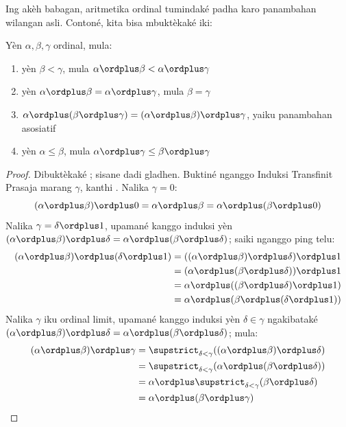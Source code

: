\documentclass[../../../include/open-logic-section]{subfiles}
\begin{document}
Ing akèh babagan, aritmetika ordinal tumindaké padha karo
panambahan wilangan asli. Contoné, kita bisa mbuktèkaké iki:

\begin{lem}
Yèn $\alpha, \beta, \gamma$ ordinal, mula:
\begin{enumerate}
	\item{} yèn $\beta < \gamma$, mula $\alpha
	\ordplus  \beta < \alpha \ordplus  \gamma$
	\item{} yèn $\alpha \ordplus  \beta =
	\alpha\ordplus \gamma$, mula $\beta = \gamma$
	\item{} $\alpha \ordplus  (\beta \ordplus
	\gamma) = (\alpha \ordplus  \beta) \ordplus  \gamma$, yaiku
	panambahan asosiatif
	\item{} yèn $\alpha \leq \beta$, mula $\alpha
	\ordplus  \gamma \leq \beta \ordplus \gamma$
\end{enumerate}
\end{lem}

\begin{proof}
Dibuktèkaké ; sisane dadi gladhen. Buktiné
nganggo Induksi Transfinit Prasaja marang $\gamma$, kanthi
. Nalika $\gamma = 0$:
\[
(\alpha \ordplus  \beta) \ordplus  0 = \alpha \ordplus  \beta  = \alpha \ordplus  (\beta \ordplus  0)
\]
Nalika $\gamma = \delta\ordplus 1$, upamané kanggo induksi yèn $(\alpha
\ordplus  \beta) \ordplus  \delta = \alpha \ordplus  (\beta \ordplus
\delta)$; saiki nganggo  ping telu:
\begin{align*}
	(\alpha \ordplus  \beta) \ordplus  (\delta \ordplus  1) & = ((\alpha \ordplus  \beta) \ordplus  \delta)\ordplus 1\\
	& = (\alpha \ordplus  (\beta \ordplus  \delta)) \ordplus  1\\
	& = \alpha \ordplus  ((\beta \ordplus  \delta)\ordplus 1)\\
	& = \alpha \ordplus  (\beta \ordplus  (\delta\ordplus 1))
\end{align*}
Nalika $\gamma$ iku ordinal limit, upamané kanggo induksi yèn
$\delta \in \gamma$ ngakibataké $(\alpha \ordplus  \beta) \ordplus  \delta =
\alpha \ordplus  (\beta \ordplus  \delta)$; mula:
\begin{align*}
	(\alpha \ordplus  \beta) \ordplus  \gamma & = \supstrict_{\delta < \gamma}((\alpha \ordplus  \beta) \ordplus  \delta) \\
	&= \supstrict_{\delta < \gamma}(\alpha \ordplus  (\beta \ordplus  \delta))\\
	&= \alpha \ordplus  \supstrict_{\delta < \gamma}(\beta \ordplus  \delta)\\
	& = \alpha \ordplus  (\beta \ordplus  \gamma)
\end{align*}
\end{proof}
\end{document}
